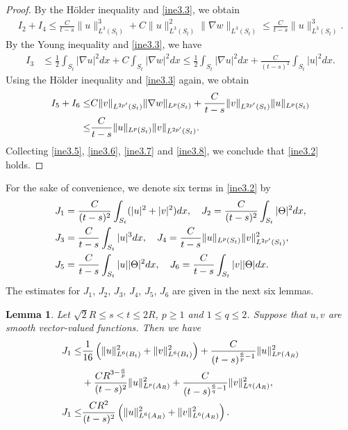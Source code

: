 \documentclass[11pt,reqno]{amsart}
\newtheorem{Lem}{Lemma}[section]
\numberwithin{Thm}{section}
\begin{document}
\begin{proof}
By the H\"{o}lder inequality and \eqref{ine3.3}, we obtain
\begin{align}\label{ine3.6}
I_2+I_4\leq\frac{C}{t-s}\|u\|_{L^{3}(S_t)}^3+C\|u\|_{L^{3}(S_t)}^{2}\|\nabla w\|_{L^{3}(S_t)}\leq\frac{C}{t-s}\|u\|_{L^{3}(S_t)}^3.
\end{align}
By the Young inequality and \eqref{ine3.3}, we have
\begin{align}\label{ine3.7}
I_3&\leq\frac{1}{2}\int_{S_t}|\nabla u|^2dx+C\int_{S_t}|\nabla w|^2dx\leq\frac{1}{2}\int_{S_t}|\nabla u|^2dx+\frac{C}{(t-s)^2}\int_{S_t}|u|^2dx.
\end{align}
Using the H\"{o}lder inequality and \eqref{ine3.3} again, we obtain
\begin{align}\label{ine3.8}
I_5+I_6\leq&C\|v\|_{L^{2p'}(S_t)}\|\nabla w\|_{L^p(S_t)}+\frac{C}{t-s}\|v\|_{L^{2p'}(S_t)}\|u\|_{L^p(S_t)}\notag\\
\leq&\frac{C}{t-s}\|u\|_{L^p(S_t)}\|v\|_{L^{2p'}(S_t)}.
\end{align}
Collecting \eqref{ine3.5}, \eqref{ine3.6}, \eqref{ine3.7} and \eqref{ine3.8}, we conclude that \eqref{ine3.2} holds.
\end{proof}


For the sake of convenience, we denote six terms in \eqref{ine3.2} by
\begin{align*}
&J_1=\frac{C}{(t-s)^2}\int_{S_t}(|u|^2+|v|^2) d x,\quad J_2=\frac{C}{(t-s)^2}\int_{S_t}|\Theta|^2 d x,\notag\\
&J_3=\frac{C}{t-s} \int_{S_t}|u|^3  d x,\quad J_4=\frac{C}{t-s}\|u\|_{L^p(S_t)}\|v\|_{L^{2p'}(S_t)}^2,\\
&J_5=\frac{C}{t-s}\int_{S_t}|u||\Theta|^2dx,\quad J_6=\frac{C}{t-s}\int_{S_t}|v||\Theta|dx.\notag
\end{align*}
The estimates for $J_1$, $J_2$, $J_3$, $J_4$, $J_5$, $J_6$ are given in the next six lemmas.

\begin{Lem}\label{Lem3.2}
Let $\sqrt{2}R\leq s<t\leq 2R$, $p\geq1$ and $1\leq q\leq2$.
Suppose that $u,v$ are smooth vector-valued functions. Then we have
\begin{align}
J_1\leq&\frac{1}{16}\left(\|u\|_{L^{6}(B_t)}^{2}+\|v\|_{L^{6}(B_t)}^{2}\right)+\frac{C}{(t-s)^{\frac{6}{p}-1}}\|u\|_{L^{p}(A_{R})}^{2}\notag\\
&+\frac{CR^{3-\frac{6}{p}}}{(t-s)^2}\|u\|_{L^p(A_{R})}^2+\frac{C}{(t-s)^{\frac{6}{q}-1}}\|v\|_{L^{q}(A_{R})}^{2},\label{ine3.9}\\
J_1\leq&\frac{CR^2}{(t-s)^2}\left(\|u\|_{L^6(A_{R})}^2 +\|v\|_{L^6(A_{R})}^2\right).\label{ine3.10}
\end{align}
\end{Lem}
\end{document}
